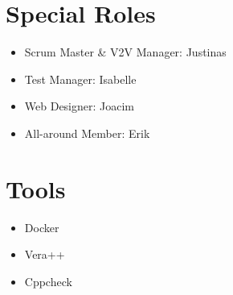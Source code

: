 \documentclass[12pt]{article}
\begin{document}
\section*{Special Roles}
\begin{itemize}
	\item Scrum Master \& V2V Manager: Justinas
	\item Test Manager: Isabelle
	\item Web Designer: Joacim
	\item All-around Member: Erik
\end{itemize}

\section*{Tools}
\begin{itemize}
	\item Docker
	\item Vera++
	\item Cppcheck
\end{itemize}
\end{document}
